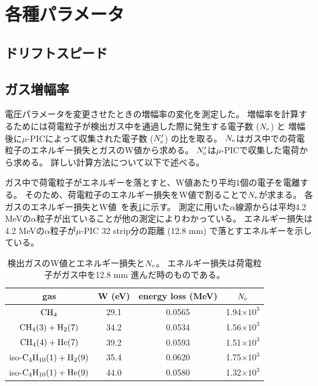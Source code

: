 \section{各種パラメータ}
\subsection{ドリフトスピード}
\subsection{ガス増幅率}
電圧パラメータを変更させたときの増幅率の変化を測定した。
増幅率を計算するためには荷電粒子が検出ガス中を通過した際に発生する電子数 ($N_{\rm e}$) と
増幅後に$\mu$-PICによって収集された電子数 ($N'_{\rm e}$) の比を取る。
$N_{\rm e}$はガス中での荷電粒子のエネルギー損失とガスのW値から求める。
$N'_{\rm e}$は$\mu$-PICで収集した電荷から求める。
詳しい計算方法について以下で述べる。

ガス中で荷電粒子がエネルギーを落とすと、W値あたり平均1個の電子を電離する。
そのため、荷電粒子のエネルギー損失をW値で割ることで$N_{\rm e}$が求まる。
各ガスのエネルギー損失とW値~\cite{energy_per_ion_pair,pdg}を表\ref{tab::energy_loss_and_W_val}に示す。
測定に用いた$\alpha$線源からは平均4.2 MeVの$\alpha$粒子が出ていることが他の測定によりわかっている。
エネルギー損失は4.2 MeVの$\alpha$粒子が$\mu$-PIC 32 strip分の距離 (12.8 mm) で落とすエネルギーを示している。
\begin{table}
  \centering
  \caption[検出ガスのW値とエネルギー損失と$N_{\rm e}$。]
          {検出ガスのW値とエネルギー損失と$N_{\rm e}$。
          エネルギー損失は荷電粒子がガス中を12.8 mm 進んだ時のものである。}
  \label{tab::energy_loss_and_W_val}
  \begin{tabular}{cccc}
    \toprule
    gas & W (eV) & energy loss (MeV) & $N_{\rm e}$\\
    \midrule
    ${\rm CH_{4}}$                          & 29.1 & 0.0565 & 1.94$\times 10^{3}$ \\
    ${\rm CH_{4} (3) + H_{2} (7)}$          & 34.2 & 0.0534 & 1.56$\times 10^{3}$ \\
    ${\rm CH_{4} (4) + He (7)}$             & 39.2 & 0.0593 & 1.51$\times 10^{3}$ \\
    iso-${\rm C_{4}H_{10} (1) + H_{2} (9)}$ & 35.4 & 0.0620 & 1.75$\times 10^{3}$ \\
    iso-${\rm C_{4}H_{10} (1) + He (9)}$    & 44.0 & 0.0580 & 1.32$\times 10^{3}$ \\
    \bottomrule
  \end{tabular}
\end{table}

